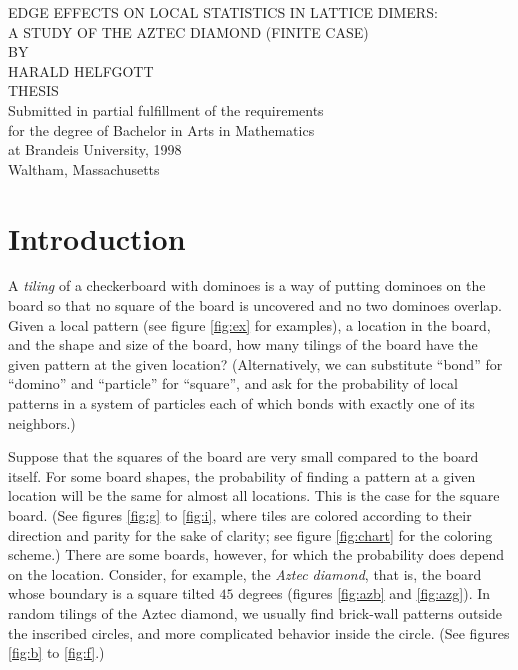 \documentclass[10pt,reqno]{amsart}
\theoremstyle{plain}
\theoremstyle{definition}
\theoremstyle{remark}
\begin{document}
 
\begin{titlepage}

\begin{center}
\vspace*{1.325in}
EDGE EFFECTS ON LOCAL STATISTICS IN LATTICE DIMERS:\\
A STUDY OF THE AZTEC DIAMOND (FINITE CASE)\\
\vspace{1.365626in}
BY\\

\vspace{.2in}
HARALD HELFGOTT\\
\vspace{1.11875in}
THESIS\\
\vspace{.2in} 
Submitted in partial fulfillment of the requirements\\
for the degree of Bachelor in Arts in Mathematics\\
at Brandeis University, 1998\\
\vspace{1.19750in}
Waltham, Massachusetts
\end{center}
\end{titlepage}
\address{Mathematics Department \\
  Brandeis University
  Waltham, MA 02254-9110}
\section{Introduction}

A {\em tiling} of a checkerboard with dominoes is a way of putting dominoes
on the board so that no square of the board is uncovered and no two dominoes
overlap.  Given a local pattern (see figure \ref{fig:ex} for examples), a 
location in the board, and the shape and size of the board, how many tilings
of the board have the given pattern at the given location? (Alternatively,
we can substitute ``bond'' for ``domino'' and ``particle'' for 
``square'', and ask for the probability of local patterns in a system
of particles each of which bonds with exactly one of its neighbors.)

Suppose that the squares of the board are very small compared to the
board itself. For some board shapes, the probability of finding a pattern
at a given location will be the same for almost all locations. This is
the case for the square board. (See figures \ref{fig:g} to \ref{fig:i},
where tiles are colored according to their direction and parity for
the sake of clarity; see figure \ref{fig:chart} for the coloring scheme.)
There are some boards, however, for which the probability does depend
on the location. Consider, for example, the {\em Aztec diamond}, that is,
the board whose boundary is a square tilted $45$ degrees 
(figures \ref{fig:azb} and \ref{fig:azg}). 
In random tilings of the Aztec diamond, we usually find brick-wall patterns 
outside the inscribed circles, and more complicated behavior inside
the circle. (See figures \ref{fig:b} to \ref{fig:f}.)
\end{document}

